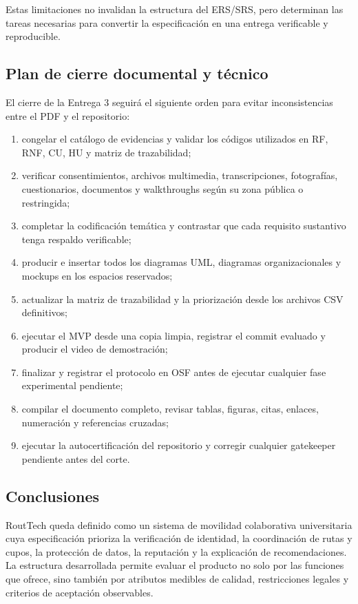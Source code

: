 \documentclass[12pt,a4paper]{article}
\begin{document}
Estas limitaciones no invalidan la estructura del ERS/SRS, pero determinan las tareas necesarias para convertir la especificación en una entrega verificable y reproducible.

\subsection{Plan de cierre documental y técnico}

El cierre de la Entrega 3 seguirá el siguiente orden para evitar inconsistencias entre el PDF y el repositorio:

\begin{enumerate}
  \item congelar el catálogo de evidencias y validar los códigos utilizados en RF, RNF, CU, HU y matriz de trazabilidad;
  \item verificar consentimientos, archivos multimedia, transcripciones, fotografías, cuestionarios, documentos y walkthroughs según su zona pública o restringida;
  \item completar la codificación temática y contrastar que cada requisito sustantivo tenga respaldo verificable;
  \item producir e insertar todos los diagramas UML, diagramas organizacionales y mockups en los espacios reservados;
  \item actualizar la matriz de trazabilidad y la priorización desde los archivos CSV definitivos;
  \item ejecutar el MVP desde una copia limpia, registrar el commit evaluado y producir el video de demostración;
  \item finalizar y registrar el protocolo en OSF antes de ejecutar cualquier fase experimental pendiente;
  \item compilar el documento completo, revisar tablas, figuras, citas, enlaces, numeración y referencias cruzadas;
  \item ejecutar la autocertificación del repositorio y corregir cualquier gatekeeper pendiente antes del corte.
\end{enumerate}

\subsection{Conclusiones}

RoutTech queda definido como un sistema de movilidad colaborativa universitaria cuya especificación prioriza la verificación de identidad, la coordinación de rutas y cupos, la protección de datos, la reputación y la explicación de recomendaciones. La estructura desarrollada permite evaluar el producto no solo por las funciones que ofrece, sino también por atributos medibles de calidad, restricciones legales y criterios de aceptación observables.
\end{document}
